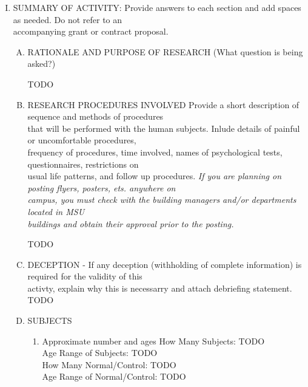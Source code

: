 \documentclass{article}
\newcommand{\response}[1]{{\color{blue}#1}}
\begin{document}
\begin{enumerate}[I.]
    \item SUMMARY OF ACTIVITY: Provide answers to each section and add spaces as needed. Do not refer to an \\
    accompanying grant or contract proposal.
    \begin{enumerate}[A.]
        \item RATIONALE AND PURPOSE OF RESEARCH (What question is being asked?)

        \response{TODO}

        \item RESEARCH PROCEDURES INVOLVED Provide a short description of sequence and methods of procedures \\
        that will be performed with the human subjects. Inlude details of painful or uncomfortable procedures, \\
        frequency of procedures, time involved, names of psychological tests, questionnaires, restrictions on \\
        usual life patterns, and follow up procedures. \color{red} \emph{If you are planning on posting flyers, posters, ets. anywhere on \\
        campus, you must check with the building managers and/or departments located in MSU\\
        buildings and obtain their approval prior to the posting.}\\\color{black}

        \response{TODO}

        \item DECEPTION - If any deception (withholding of complete information) is required for the validity of this\\
        activty, explain why this is necessarry and attach debriefing statement. \\

        \response{TODO}

        \item SUBJECTS
        \begin{enumerate}[1.]

            \item Approximate number and ages
            How Many Subjects: \response{TODO} \\
            Age Range of Subjects: \response{TODO} \\
            How Many Normal/Control: \response{TODO} \\
            Age Range of Normal/Control: \response{TODO} \\


\end{enumerate}
\end{enumerate}
\end{enumerate}
\end{document}
